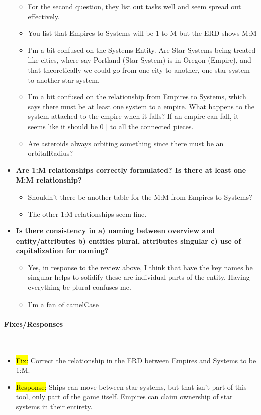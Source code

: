 \documentclass[12pt]{article}
\newcommand{\hiparagraph}[1]{\paragraph{#1}\mbox{}\vspace{-2em}\\}
\DeclareRobustCommand{\fix}[1]{{\sethlcolor{YellowGreen}\hl{Fix:} #1}}
\DeclareRobustCommand{\response}[1]{{\sethlcolor{ResponseRed}\hl{Response:} #1}}
\begin{document}
\begin{appendices}
\begin{itemize}
    \begin{itemize}
        \item For the second question, they list out tasks well and seem spread out effectively.
        \item You list that Empires to Systems will be 1 to M but the ERD shows M:M
        \item I'm a bit confused on the Systems Entity. Are Star Systems being treated like cities, where say Portland (Star System) is in Oregon (Empire), and that theoretically we could go from one city to another, one star system to another star system.
        \item I'm a bit confused on the relationship from Empires to Systems, which says there must be at least one system to a empire. What happens to the system attached to the empire when it falls? If an empire can fall, it seems like it should be 0 | to all the connected pieces.
        \item Are asteroids always orbiting something since there must be an orbitalRadius?
    \end{itemize}
    \item \textbf{Are 1:M relationships correctly formulated? Is there at least  one M:M relationship?}
    \begin{itemize}
        \item Shouldn't there be another table for the M:M from Empires to Systems? 
        \item The other 1:M relationships seem fine.
    \end{itemize}
    \item \textbf{Is there consistency in a) naming between overview and entity/attributes b) entities plural, attributes singular c) use of capitalization for naming?}
    \begin{itemize}
        \item Yes, in response to the review above, I think that have the key names be singular helps to solidify these are individual parts of the entity. Having everything be plural confuses me.
        \item I'm a fan of camelCase
    \end{itemize}
\end{itemize}
\hiparagraph{Fixes/Responses}
\begin{itemize}
    \item \fix{Correct the relationship in the ERD between Empires and Systems to be 1:M.}
    \item \response{Ships can move between star systems, but that isn’t part of this tool, only part of the game itself. Empires can claim ownership of star systems in their entirety.}

\end{itemize}
\end{appendices}
\end{document}
